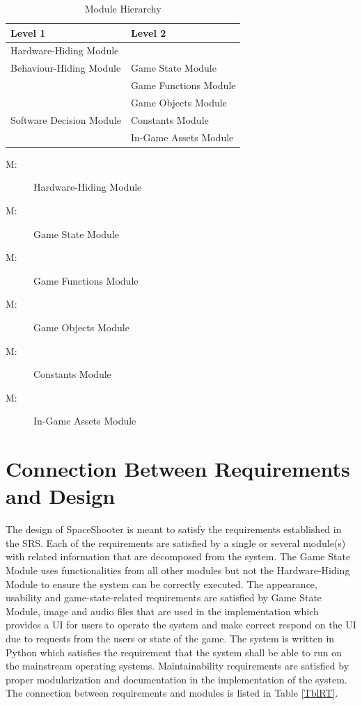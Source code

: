 \documentclass[12pt, titlepage]{article}
\newcounter{mnum}
\newcommand{\mthemnum}{M\themnum}
\begin{document}
\begin{table}[h!]
\centering
\begin{tabular}{p{} p{}}
\toprule
\textbf{Level 1} & \textbf{Level 2}\\
\midrule


{Hardware-Hiding Module} & \\
\midrule

\multirow{1}{0.3\textwidth}{Behaviour-Hiding Module} & Game State Module\\
& Game Functions Module \\
& Game Objects Module \\
\midrule

\multirow{1}{0.3\textwidth}{Software Decision Module} & Constants Module\\
& In-Game Assets Module \\
\bottomrule

\end{tabular}
\caption{Module Hierarchy}
\label{TblMH}
\end{table}

\begin{description}
\item [ \mthemnum \label{mHH}:] Hardware-Hiding Module
\item [ \mthemnum \label{mGS}:] Game State Module
\item [ \mthemnum \label{mGF}:] Game Functions Module
\item [ \mthemnum \label{mGO}:] Game Objects Module
\item [ \mthemnum \label{mC}:] Constants Module
\item [ \mthemnum \label{mIGA}:] In-Game Assets Module

\end{description}

\section{Connection Between Requirements and Design} \label{SecConnection}

The design of SpaceShooter is meant to satisfy the requirements established in the SRS. Each of the requirements are satisfied by a single or several module(s) with related information that are decomposed from the system. The Game State Module uses functionalities from all other modules but not the Hardware-Hiding Module to ensure the system can be correctly executed. The appearance, usability and game-state-related requirements are satisfied by Game State Module, image and audio files that are used in the implementation which provides a UI for users to operate the system and make correct respond on the UI due to requests from the users or state of the game.\newline
The system is written in Python which satisfies the requirement that the system shall be able to run on the mainstream operating systems. Maintainability requirements are satisfied by proper modularization and documentation in the implementation of the system. The connection between requirements and modules is listed in Table \ref{TblRT}.
\end{document}
